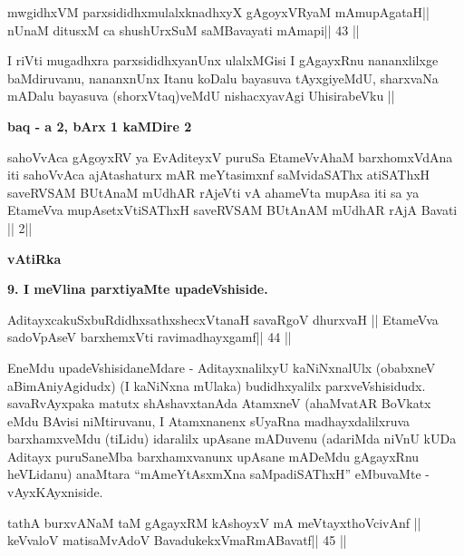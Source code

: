 \begin{shl}
mwgidhxVM parxsididhxmulalxknadhxyX gAgoyxVR\s yaM mAmupAgataH||
nUnaM ditusxM ca shushUrxSuM saMBavayati mAmapi\hfill || 43 ||
\end{shl}

\begin{artha}
I riVti mugadhxra parxsididhxyanUnx ulalxMGisi I gAgayxRnu nananxlilxge baMdiruvanu, nananxnUnx Itanu koDalu bayasuva tAyxgiyeMdU, sharxvaNa mADalu bayasuva (shorxVtaq)veMdU nishacxyavAgi UhisirabeVku ||
\end{artha}

\begin{center}
{\bf baq - a 2, bArx 1 kaMDire 2}
\end{center}

\begin{shl}
sahoVvAca gAgoyxRV ya EvA\s diteyxV puruSa
EtameVvAhaM barxhomxVdAna iti sahoVvAca
ajAtashaturx mAR meYtasimxnf saMvidaSAThx atiSAThxH
saveRVSAM BUtAnaM mUdhAR rAjeVti vA
ahameVta mupAsa iti sa ya EtameVva
mupAsetxV\s tiSAThxH saveRVSAM BUtAnAM mUdhAR
rAjA Bavati || 2||
\end{shl}

\begin{center}
{\bf vAtiRka}
\end{center}

\begin{artha}
{\bf 9. I meVlina parxtiyaMte upadeVshiside.}
\end{artha}

\begin{shl}
AditayxcakuSxbuRdidhxsathxshecxVtanaH savaRgoV dhurxvaH ||
EtameVva sadoVpAseV barxhemxVti ravimadhayxgamf\hfill || 44 ||
\end{shl}

\begin{artha}
EneMdu upadeVshisidaneMdare - AditayxnalilxyU kaNiNxnalUlx (obabxneV aBimAniyAgidudx) (I kaNiNxna mUlaka) budidhxyalilx parxveVshisidudx. savaRvAyxpaka matutx shAshavxtanAda AtamxneV (ahaMvatAR BoVkatx eMdu BAvisi niMtiruvanu, I Atamxnanenx sUyaRna madhayxdalilxruva barxhamxveMdu (tiLidu) idaralilx upAsane mADuvenu (adariMda niVnU kUDa Aditayx puruSaneMba barxhamxvanunx upAsane mADeMdu gAgayxRnu heVLidanu) anaMtara ``mAmeYtAsxmXna saMpadiSAThxH'' eMbuvaMte - vAyxKAyxniside.
\end{artha}

\begin{shl}
tathA burxvANaM taM gAgayxRM kAshoyxV mA meVtayxthoVcivAnf ||
keVvaloV matisaMvAdoV BavadukekxVmaRmABavatf\hfill || 45 ||
\end{shl}

